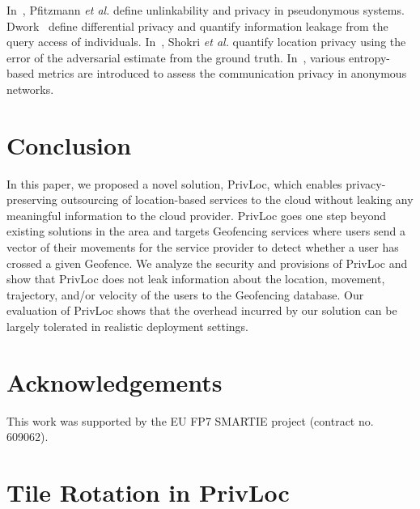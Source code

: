 \documentclass{llncs}
\newcommand\sol{{\sf PrivLoc}}
\begin{document}
In~\cite{terminology}, Pfitzmann \emph{et al.} define unlinkability and privacy in pseudonymous systems.
Dwork~\cite{diffprivacy} define differential privacy and quantify information leakage
from the query access of individuals. In~\cite{locprivacy}, Shokri \emph{et al.} quantify location privacy using the error of the adversarial estimate from the ground truth. In~\cite{Diaz02,Serj02}, various entropy-based metrics are introduced to assess the communication privacy in anonymous
networks.

\vspace{-1 em}
\section{Conclusion}\label{sec:conclusion}

In this paper, we proposed a novel solution, \sol, which enables privacy-preserving outsourcing of location-based services to the cloud without
 leaking any meaningful information to the cloud provider. \sol{} goes one step beyond existing solutions in the area and targets Geofencing services where
 users send a vector of their movements for the service provider to detect whether a user has crossed a given Geofence.
 We analyze the security and provisions of \sol{} and show that \sol{} does not leak information about the location, movement, trajectory, and/or velocity of the users to the Geofencing database. Our
 evaluation of \sol{} shows that the overhead incurred by our solution can be largely tolerated in realistic deployment settings.

\vspace{-1 em}
\section*{Acknowledgements}
\vspace{-0.5 em}
This work was supported by the EU FP7 SMARTIE project (contract no. 609062).
\vspace{-1 em}



\vspace{-0.5 em}
\appendix
\footnotesize
\vspace{-1 em}
\section{Tile Rotation in \sol}\label{alg:rotate}
\vspace{-0.5 em}
\end{document}
